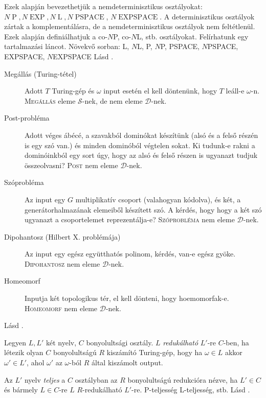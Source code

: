 \documentclass[DIV=15,appendixprefix]{scrreprt}
\theoremstyle{definition}
\theoremstyle{remark}
\DeclareMathOperator{\Pbonya}{P}
\DeclareMathOperator{\EXP}{EXP}
\DeclareMathOperator{\PSPACE}{PSPACE}
\DeclareMathOperator{\EXPSPACE}{EXPSPACE}
\DeclareMathOperator{\Lbonya}{L}
\begin{document}
Ezek alapján bevezethetjük a
nemdeterminisztikus osztályokat: $N\Pbonya,{} N \EXP,{} N\Lbonya,{} N\PSPACE $, $N\EXPSPACE$. A
determinisztikus osztályok zártak a komplementálásra, de a nemdeterminisztikus osztályok
nem feltétlenül. Ezek alapján definiálhatjuk a co-$N$P, co-$N$L, stb. osztályokat. Felírhatunk egy
tartalmazási láncot. Növekvő sorban: L, $N$L, P, $N$P, PSPACE, $N$PSPACE, EXPSPACE, $N$EXPSPACE
%
Lásd
\cite[\href{http://www.math.u-szeged.hu/~hajnal/courses/MSc_Bonyolultsag/ea04.pdf}{
\emph{Példák}}]{Bonya}.
\begin{description}
	\item[Megállás (Turing-tétel)] Adott $T$ Turing-gép és $\omega$ input esetén el kell döntenünk,
		hogy $T$ leáll-e $\omega$-n. \textsc{Megállás} eleme $\mathcal{S}$-nek, de nem eleme
		$\mathcal{D}$-nek.
	\item[Post-probléma] Adott véges ábécé, a szavakból dominókat készítünk (alsó és a felső részén
		is egy szó van.) és minden dominóból végtelen sokat. Ki tudunk-e rakni a dominóinkból egy
		sort úgy, hogy az alsó és felső részen is ugyanazt tudjuk összeolvasni? \textsc{Post} nem
		eleme $\mathcal{D}$-nek.
	\item[Szóprobléma] Az input egy $G$ multiplikatív csoport (valahogyan kódolva), és két, a
		generátorhalmazának elemeiből készített szó. A kérdés, hogy hogy a két szó ugyanazt a
		csoportelemet reprezentálja-e? \textsc{Szóprobléma} nem eleme $\mathcal{D}$-nek.
	\item[Dipohantosz (Hilbert X. problémája)] Az input egy egész együtthatós polinom, kérdés, van-e
		egész gyöke. \textsc{Dipohantosz} nem eleme $\mathcal{D}$-nek.
	\item[Homeomorf] Inputja két topologikus tér, el kell dönteni, hogy hoemomorfak-e.
		\textsc{Homeomorf} nem eleme $\mathcal{D}$-nek.
\end{description}
%
Lásd
\cite[\href{http://www.math.u-szeged.hu/~hajnal/courses/MSc_Bonyolultsag/ea05.pdf}{
\emph{Redukciók, teljes nyelvek\ldots}}]{Bonya}.

Legyen $L,{}L'$ két nyelv, $C$ bonyolultsági osztály. $L$ \emph{redukálható} $L'$-re $C$-ben, ha
létezik
olyan $C$ bonyolultságú $R$ kiszámító Turing-gép, hogy ha $\omega \in L$ akkor $\omega' \in L'$,
ahol $\omega'$ az $\omega$-ból $R$ által kiszámolt output.

Az $L'$ nyelv \emph{teljes} a $C$ osztályban az $R$ bonyolultságú redukcióra nézve, ha $L' \in C$
és bármely $L \in C$-re $L$ $R$-redukálható $L'$-re. P-teljesség L-teljesség, stb.
%
Lásd
\cite[\href{http://www.math.u-szeged.hu/~hajnal/courses/MSc_Bonyolultsag/ea07.pdf}{
\emph{P-teljes és NP-teljes problémák, Cook-Levin tétel}}]{Bonya}.
\end{document}
